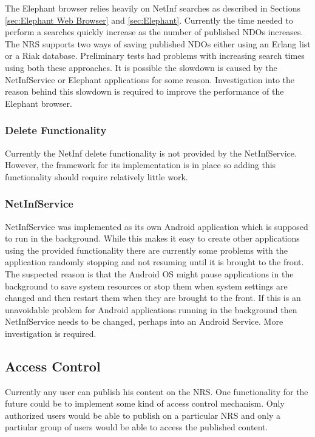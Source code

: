 The Elephant browser relies heavily on NetInf searches as described in Sections \ref{sec:Elephant Web Browser} and \ref{sec:Elephant}. Currently the time needed to perform a searches quickly increase as the number of published NDOs increases. The NRS supports two ways of saving published NDOs either using an Erlang list or a Riak database. Preliminary tests had problems with increasing search times using both these approaches. It is possible the slowdown is caused by the NetInfService or Elephant applications for some reason. Investigation into the reason behind this slowdown is required to improve the performance of the Elephant browser.

\subsubsection{Delete Functionality}

Currently the NetInf delete functionality is not provided by the NetInfService. However, the framework for its implementation is in place so adding this functionality should require relatively little work.

\subsubsection{NetInfService}

NetInfService was implemented as its own Android application which is supposed to run in the background. While this makes it easy to create other applications using the provided functionality there are currently some problems with the application randomly stopping and not resuming until it is brought to the front. The suspected reason is that the Android OS might pause applications in the background to save system resources or stop them when system settings are changed and then restart them when they are brought to the front. If this is an unavoidable problem for Android applications running in the background then NetInfService needs to be changed, perhaps into an Android Service. More investigation is required.

\subsection{Access Control}

Currently any user can publish his content on the NRS. One functionality for the future could be to implement some kind of access control mechanism. Only authorized users would be able to publish on a particular NRS and only a partiular group of users would be able to access the published content. 

